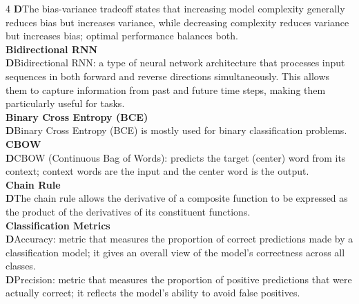 \documentclass[8pt]{extarticle}
\newcommand{\dtag}{\textcolor{definitioncolor}{\tiny\textbf{D}}\;}
\begin{document}
\begin{multicols}{4}
\dtag The bias-variance tradeoff states that increasing model complexity generally reduces bias but increases variance, while decreasing complexity reduces variance but increases bias; optimal performance balances both.\\
\vspace{2pt}\textbf{Bidirectional RNN}\\
\dtag Bidirectional RNN: a type of neural network architecture that processes input sequences in both forward and reverse directions simultaneously. This allows them to capture information from past and future time steps, making them particularly useful for tasks.\\
\vspace{2pt}\textbf{Binary Cross Entropy (BCE)}\\
\dtag Binary Cross Entropy (BCE) is mostly used for binary classification problems.\\
\vspace{2pt}\textbf{CBOW}\\
\dtag CBOW (Continuous Bag of Words): predicts the target (center) word from its context; context words are the input and the center word is the output.\\
\vspace{2pt}\textbf{Chain Rule}\\
\dtag The chain rule allows the derivative of a composite function to be expressed as the product of the derivatives of its constituent functions.\\
\vspace{2pt}\textbf{Classification Metrics}\\
\dtag Accuracy: metric that measures the proportion of correct predictions made by a classification model; it gives an overall view of the model's correctness across all classes.\\
\dtag Precision: metric that measures the proportion of positive predictions that were actually correct; it reflects the model's ability to avoid false positives.\\


\end{multicols}
\end{document}

